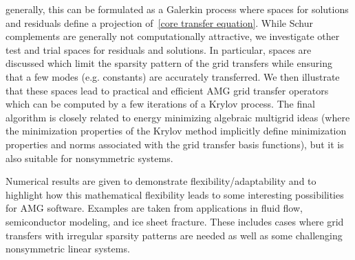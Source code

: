 \documentclass{report}
\begin{document}
generally, this can be formulated as a Galerkin process where
spaces for solutions and residuals define a projection
of~\eqref{core transfer equation}. While Schur
complements are generally not computationally attractive,
we investigate other test and trial spaces for residuals and solutions.
In particular, spaces are discussed which limit the sparsity pattern
of the grid transfers while ensuring that a few modes (e.g. constants)
are accurately transferred. We then illustrate that
these spaces lead to practical and efficient AMG grid transfer
operators which can be computed by a few iterations of a Krylov
process.
The final algorithm is closely
related to energy minimizing algebraic multigrid ideas (where the minimization
properties of the Krylov method implicitly define minimization properties and
norms associated with the grid transfer basis functions),
but it is also suitable for nonsymmetric systems.

Numerical results are given to demonstrate flexibility/adaptability
and to highlight how this mathematical flexibility leads to some
interesting possibilities for AMG software.
Examples are taken from
applications in fluid flow, semiconductor modeling, and ice sheet fracture.
These includes cases where
grid transfers with irregular sparsity patterns are needed
as well as some
challenging nonsymmetric linear systems.
\end{document}
